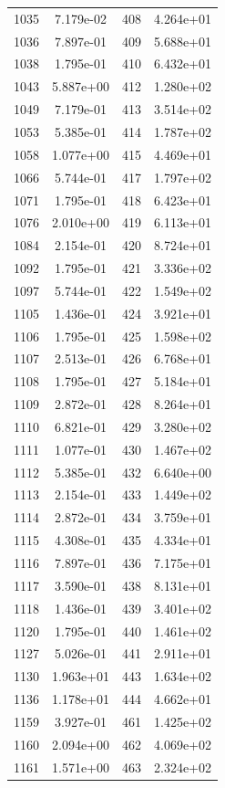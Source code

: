 \documentclass[12pt]{article}
\begin{document}
\begin{longtable}{@{}cccc@{}}
1035 & 7.179e-02 & 408 & 4.264e+01 \\
1036 & 7.897e-01 & 409 & 5.688e+01 \\
1038 & 1.795e-01 & 410 & 6.432e+01 \\
1043 & 5.887e+00 & 412 & 1.280e+02 \\
1049 & 7.179e-01 & 413 & 3.514e+02 \\
1053 & 5.385e-01 & 414 & 1.787e+02 \\
1058 & 1.077e+00 & 415 & 4.469e+01 \\
1066 & 5.744e-01 & 417 & 1.797e+02 \\
1071 & 1.795e-01 & 418 & 6.423e+01 \\
1076 & 2.010e+00 & 419 & 6.113e+01 \\
1084 & 2.154e-01 & 420 & 8.724e+01 \\
1092 & 1.795e-01 & 421 & 3.336e+02 \\
1097 & 5.744e-01 & 422 & 1.549e+02 \\
1105 & 1.436e-01 & 424 & 3.921e+01 \\
1106 & 1.795e-01 & 425 & 1.598e+02 \\
1107 & 2.513e-01 & 426 & 6.768e+01 \\
1108 & 1.795e-01 & 427 & 5.184e+01 \\
1109 & 2.872e-01 & 428 & 8.264e+01 \\
1110 & 6.821e-01 & 429 & 3.280e+02 \\
1111 & 1.077e-01 & 430 & 1.467e+02 \\
1112 & 5.385e-01 & 432 & 6.640e+00 \\
1113 & 2.154e-01 & 433 & 1.449e+02 \\
1114 & 2.872e-01 & 434 & 3.759e+01 \\
1115 & 4.308e-01 & 435 & 4.334e+01 \\
1116 & 7.897e-01 & 436 & 7.175e+01 \\
1117 & 3.590e-01 & 438 & 8.131e+01 \\
1118 & 1.436e-01 & 439 & 3.401e+02 \\
1120 & 1.795e-01 & 440 & 1.461e+02 \\
1127 & 5.026e-01 & 441 & 2.911e+01 \\
1130 & 1.963e+01 & 443 & 1.634e+02 \\
1136 & 1.178e+01 & 444 & 4.662e+01 \\
1159 & 3.927e-01 & 461 & 1.425e+02 \\
1160 & 2.094e+00 & 462 & 4.069e+02 \\
1161 & 1.571e+00 & 463 & 2.324e+02 \\

\end{longtable}
\end{document}
